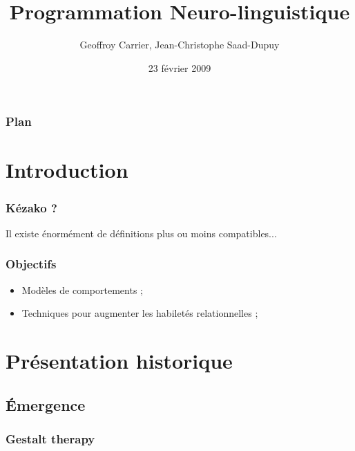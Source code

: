 \documentclass{beamer}
\title{Programmation Neuro-linguistique}
\author{Geoffroy Carrier, Jean-Christophe Saad-Dupuy}
\institute{Université Joseph Fourier, L3 MIAGE}
\date{23 février 2009}
\begin{document}
\frame{\titlepage}

\begin{frame}
\frametitle{Plan}
\tableofcontents
\end{frame}

\section{Introduction} %
\label{sec:introduction}
\begin{frame}[t]\frametitle{Kézako ?}
	Il existe énormément de définitions plus ou moins compatibles...
	\begin{cite}
		
	\end{cite}
\end{frame}

\begin{frame}[t]\frametitle{Objectifs}
	\begin{itemize}
		\item<+-> Modèles de comportements ;
		\item<+-> Techniques pour augmenter les habiletés relationnelles ;
	\end{itemize}
\end{frame}


\section{Présentation historique}
\subsection{Émergence}

\subsubsection{Gestalt therapy}
\end{document}
